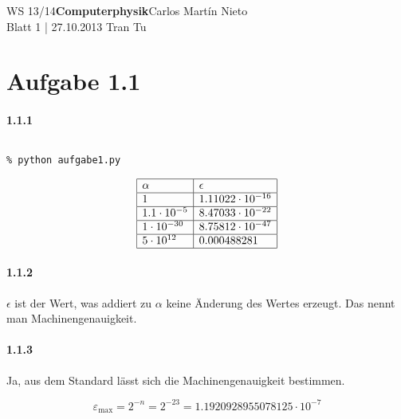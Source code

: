 \documentclass[a4paper,ngerman]{scrartcl}
\begin{document}
\noindent WS 13/14\hfill \textbf{Computerphysik}\hfill Carlos Martín Nieto\\
Blatt 1 | 27.10.2013 \hfill Tran Tu\\

\noindent\hrulefill

\section*{Aufgabe 1.1}

\paragraph{1.1.1}

\inputminted[mathescape,linenos]{python}{aufgabe1.py}

\texttt{\% python aufgabe1.py}

\[
\begin{array}{|l|l|}\hline
  \alpha & \epsilon\\\hline
  1       &1.11022\cdot 10^{-16}\\\hline
  1.1\cdot 10^{-5} &8.47033\cdot 10^{-22}\\\hline
  1\cdot 10^{-30}   &8.75812\cdot 10^{-47}\\\hline
  5\cdot 10^{12}   &0.000488281\\\hline
\end{array}
\]
\paragraph{1.1.2}

$\epsilon$ ist der Wert, was addiert zu $\alpha$ keine Änderung des Wertes erzeugt. Das nennt man Machinengenauigkeit.

\paragraph{1.1.3}

Ja, aus dem Standard lässt sich die Machinengenauigkeit bestimmen.

\[
\varepsilon_{\text{max}} = 2^{-n} = 2^{-23} = 1.1920928955078125\cdot 10^{-7}
\]
\end{document}
